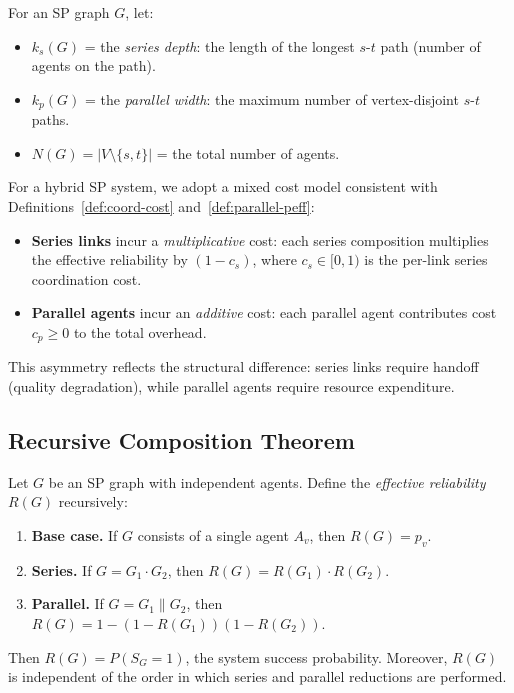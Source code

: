 \begin{definition}
\label{def:r4-sp-params}
For an SP graph $G$, let:
\begin{itemize}
  \item $k_s(G)$ = the \emph{series depth}: the length of the longest $s$-$t$ path
    (number of agents on the path).
  \item $k_p(G)$ = the \emph{parallel width}: the maximum number of vertex-disjoint
    $s$-$t$ paths.
  \item $N(G) = |V \setminus \{s,t\}|$ = the total number of agents.
\end{itemize}
\end{definition}

\begin{definition}
\label{def:r4-hybrid-cost}
For a hybrid SP system, we adopt a mixed cost model consistent with
Definitions~\ref{def:coord-cost} and~\ref{def:parallel-peff}:
\begin{itemize}
  \item \textbf{Series links} incur a \emph{multiplicative} cost: each series
    composition multiplies the effective reliability by $(1-c_s)$, where
    $c_s \in [0,1)$ is the per-link series coordination cost.
  \item \textbf{Parallel agents} incur an \emph{additive} cost: each parallel agent
    contributes cost $c_p \ge 0$ to the total overhead.
\end{itemize}
This asymmetry reflects the structural difference: series links require handoff
(quality degradation), while parallel agents require resource expenditure.
\end{definition}

\subsection{Recursive Composition Theorem}

\begin{theorem}
\label{thm:r4-sp-reliability}
Let $G$ be an SP graph with independent agents.  Define the \emph{effective
reliability} $R(G)$ recursively:
\begin{enumerate}
  \item \textbf{Base case.} If $G$ consists of a single agent $A_v$, then $R(G) = p_v$.
  \item \textbf{Series.} If $G = G_1 \cdot G_2$, then $R(G) = R(G_1) \cdot R(G_2)$.
  \item \textbf{Parallel.} If $G = G_1 \| G_2$, then
    $R(G) = 1 - (1 - R(G_1))(1 - R(G_2))$.
\end{enumerate}
Then $R(G) = P(S_G = 1)$, the system success probability.  Moreover, $R(G)$ is
independent of the order in which series and parallel reductions are performed.
\end{theorem}

